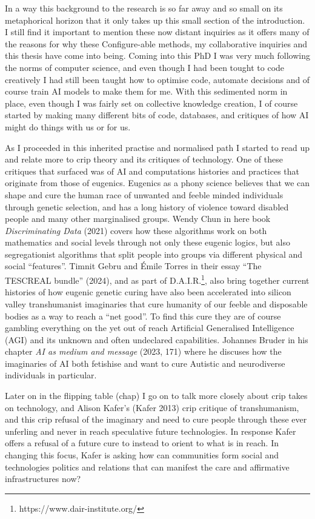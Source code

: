 In a way this background to the research is so far away and so small on
its metaphorical horizon that it only takes up this small section of the
introduction. I still find it important to mention these now distant
inquiries as it offers many of the reasons for why these Configure-able
methods, my collaborative inquiries and this thesis have come into
being. Coming into this PhD I was very much following the norms of
computer science, and even though I had been tought to code creatively I
had still been taught how to optimise code, automate decisions and of
course train AI models to make them for me. With this sedimented norm in
place, even though I was fairly set on collective knowledge creation, I
of course started by making many different bits of code, databases, and
critiques of how AI might do things with us or for us.

As I proceeded in this inherited practise and normalised path I started
to read up and relate more to crip theory and its critiques of
technology. One of these critiques that surfaced was of AI and
computations histories and practices that originate from those of
eugenics. Eugenics as a phony science believes that we can shape and
cure the human race of unwanted and feeble minded individuals through
genetic selection, and has a long history of violence toward disabled
people and many other marginalised groups. Wendy Chun in here book
\emph{Discriminating Data} (2021) covers how these algorithms work on
both mathematics and social levels through not only these eugenic
logics, but also segregationist algorithms that split people into groups
via different physical and social ``features''. Timnit Gebru and Émile
Torres in their essay ``The TESCREAL bundle'' (2024), and as part of
D.A.I.R.\footnote{https://www.dair-institute.org/}, also bring together
current histories of how eugenic genetic curing have also been
accelerated into silicon valley transhumanist imaginaries that cure
humanity of our feeble and disposable bodies as a way to reach a ``net
good''. To find this cure they are of course gambling everything on the
yet out of reach Artificial Generalised Intelligence (AGI) and its
unknown and often undeclared capabilities. Johannes Bruder in his
chapter \emph{AI as medium and message} (2023, 171) where he discuses
how the imaginaries of AI both fetishise and want to cure Autistic and
neurodiverse individuals in particular.

Later on in the flipping table (chap) I go on to talk more closely about
crip takes on technology, and Alison Kafer's (Kafer 2013) crip critique
of transhumanism, and this crip refusal of the imaginary and need to
cure people through these ever unferling and never in reach speculative
future technologies. In response Kafer offers a refusal of a future cure
to instead to orient to what is in reach. In changing this focus, Kafer
is asking how can communities form social and technologies politics and
relations that can manifest the care and affirmative infrastructures
now?

